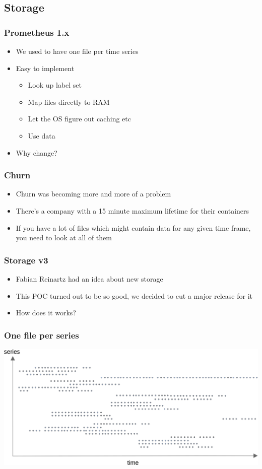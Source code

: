 \documentclass[t]{beamer}
\begin{document}
\subsection{Storage}

\begin{frame}
	\frametitle{Prometheus 1.x}
	\begin{itemize}
		\item We used to have one file per time series
		\item Easy to implement
		\begin{itemize}
			\item Look up label set
			\item Map files directly to RAM
			\item Let the OS figure out caching etc
			\item Use data
		\end{itemize}
		\item Why change?
	\end{itemize}
\end{frame}

\begin{frame}
	\frametitle{Churn}
	\begin{itemize}
		\item Churn was becoming more and more of a problem
		\item There's a company with a 15 minute maximum lifetime for their containers
		\item If you have a lot of files which might contain data for any given time frame, you need to look at all of them
	\end{itemize}
\end{frame}

\begin{frame}
	\frametitle{Storage v3}
	\begin{itemize}
		\item Fabian Reinartz had an idea about new storage
		\item This POC turned out to be so good, we decided to cut a major release for it
		\item How does it works?
	\end{itemize}
\end{frame}

\begin{frame}
	\frametitle{One file per series}
	\includegraphics[width=\textwidth]{storage--file_per_series.png}
\end{frame}
\end{document}
